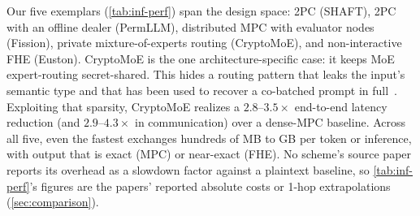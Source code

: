Our five exemplars (\cref{tab:inf-perf}) span the design space: 2PC (SHAFT), 2PC with an offline
dealer (PermLLM), distributed MPC with evaluator nodes (Fission), private mixture-of-experts
routing (CryptoMoE), and non-interactive FHE (Euston). CryptoMoE is the one architecture-specific
case: it keeps MoE expert-routing secret-shared. This hides a routing pattern that leaks the input's
semantic type and that has been used to recover a co-batched prompt in full~\citep{yona_moe_steal}.
Exploiting that sparsity, CryptoMoE realizes a $2.8$--$3.5\times$ end-to-end latency reduction (and
$2.9$--$4.3\times$ in communication) over a dense-MPC baseline. Across all five, even the fastest
exchanges hundreds of MB to GB per token or inference, with output that is exact (MPC) or near-exact (FHE).
No scheme's source paper reports its overhead as a slowdown factor against a plaintext baseline, so
\cref{tab:inf-perf}'s figures are the papers' reported absolute costs or 1-hop extrapolations
(\cref{sec:comparison}).

